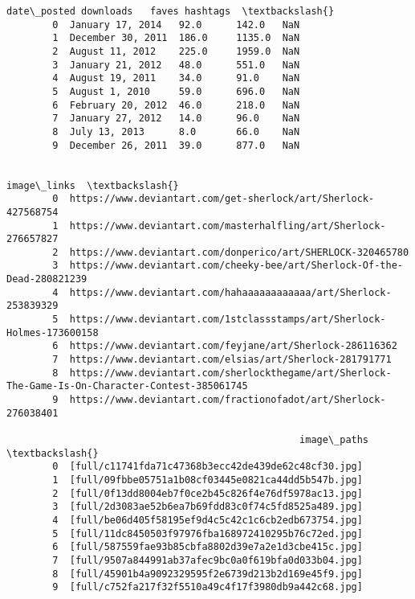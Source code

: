 \documentclass[11pt]{article}
\begin{document}
\begin{Verbatim}[commandchars=\\\{\}]
                 date\_posted downloads   faves hashtags  \textbackslash{}
        0  January 17, 2014   92.0      142.0   NaN       
        1  December 30, 2011  186.0     1135.0  NaN       
        2  August 11, 2012    225.0     1959.0  NaN       
        3  January 21, 2012   48.0      551.0   NaN       
        4  August 19, 2011    34.0      91.0    NaN       
        5  August 1, 2010     59.0      696.0   NaN       
        6  February 20, 2012  46.0      218.0   NaN       
        7  January 27, 2012   14.0      96.0    NaN       
        8  July 13, 2013      8.0       66.0    NaN       
        9  December 26, 2011  39.0      877.0   NaN       
        
                                                                                                  image\_links  \textbackslash{}
        0  https://www.deviantart.com/get-sherlock/art/Sherlock-427568754                                       
        1  https://www.deviantart.com/masterhalfling/art/Sherlock-276657827                                     
        2  https://www.deviantart.com/donperico/art/SHERLOCK-320465780                                          
        3  https://www.deviantart.com/cheeky-bee/art/Sherlock-Of-the-Dead-280821239                             
        4  https://www.deviantart.com/hahaaaaaaaaaaaa/art/Sherlock-253839329                                    
        5  https://www.deviantart.com/1stclassstamps/art/Sherlock-Holmes-173600158                              
        6  https://www.deviantart.com/feyjane/art/Sherlock-286116362                                            
        7  https://www.deviantart.com/elsias/art/Sherlock-281791771                                             
        8  https://www.deviantart.com/sherlockthegame/art/Sherlock-The-Game-Is-On-Character-Contest-385061745   
        9  https://www.deviantart.com/fractionofadot/art/Sherlock-276038401                                     
        
                                                   image\_paths  \textbackslash{}
        0  [full/c11741fda71c47368b3ecc42de439de62c48cf30.jpg]   
        1  [full/09fbbe05751a1b08cf03445e0821ca44dd5b547b.jpg]   
        2  [full/0f13dd8004eb7f0ce2b45c826f4e76df5978ac13.jpg]   
        3  [full/2d3083ae52b6ea7b69fdd83c0f74c5fd8525a489.jpg]   
        4  [full/be06d405f58195ef9d4c5c42c1c6cb2edb673754.jpg]   
        5  [full/11dc8450503f97976fba168972410295b76c72ed.jpg]   
        6  [full/587559fae93b85cbfa8802d39e7a2e1d3cbe415c.jpg]   
        7  [full/9507a844991ab37afec9bc0a0f619bfa0d033b04.jpg]   
        8  [full/45901b4a9092329595f2e6739d213b2d169e45f9.jpg]   
        9  [full/c752fa217f32f5510a49c4f17f3980db9a442c68.jpg]   
        

\end{Verbatim}
\end{document}
